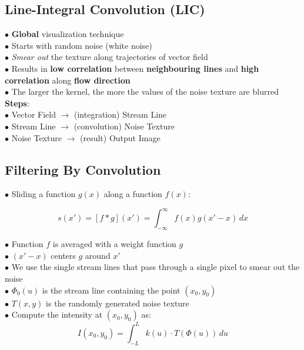 \subsection{Line-Integral Convolution (LIC)}
$\bullet$ \textbf{Global} visualization technique \\
$\bullet$ Starts with random noise (white noise) \\
$\bullet$ \textit{Smear out} the texture along trajectories of vector field \\
$\bullet$  Results in \textbf{low correlation} between \textbf{neighbouring lines} and \textbf{high correlation} along \textbf{flow direction} \\
$\bullet$ The larger the kernel, the more the values of the noise texture are blurred \\

\textbf{Steps}: \\
$\bullet$ Vector Field $\rightarrow$ (integration) Stream Line \\
$\bullet$ Stream Line $\rightarrow$ (convolution) Noise Texture \\
$\bullet$ Noise Texture $\rightarrow$ (result) Output Image \\

\subsection{Filtering By Convolution}
$\bullet$ Sliding a function $g(x)$ along a function $f(x)$:

$$s(x') = [f * g](x') = \int_{-\infty}^{\infty} f(x) g(x' - x) \,dx$$

$\bullet$ Function $f$ is averaged with a weight function $g$ \\
$\bullet$ $(x' - x)$ centers $g$ around $x'$ \\

$\bullet$ We use the single stream lines that pass through a single pixel to smear out the noise \\
$\bullet$ $\varPhi_0 (u)$ is the stream line containing the point $(x_0, y_0)$ \\
$\bullet$ $T(x, y)$ is the randomly generated noise texture \\
$\bullet$ Compute the intensity at $(x_0, y_0)$ as: \\
$$I(x_0, y_0) = \int_{-L}^{L} k(u) \cdot T(\varPhi(u)) \,du$$
